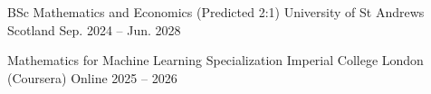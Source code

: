 

\begin{cventries}

  \cventry
    {BSc Mathematics and Economics (Predicted 2:1)} %
    {University of St Andrews} %
    {Scotland} %
    {Sep. 2024 -- Jun. 2028} %
    {}

  \cventry
    {Mathematics for Machine Learning Specialization} %
    {Imperial College London (Coursera)} %
    {Online} %
    {2025 -- 2026} %
    {}


\end{cventries}

